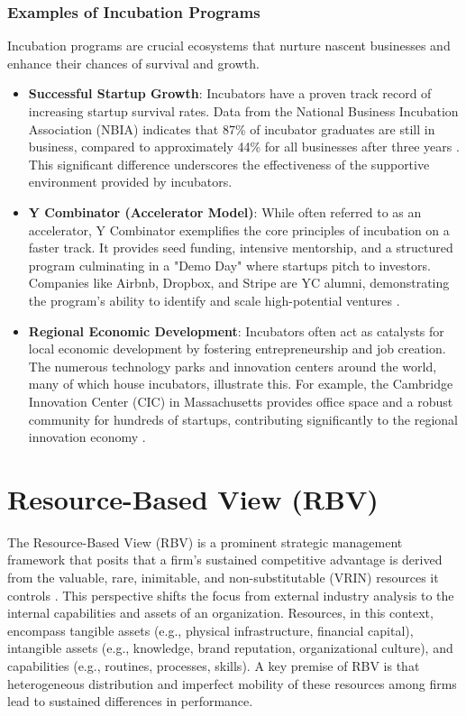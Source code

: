 \documentclass[../Main.tex]{subfiles}
\begin{document}
\subsubsection*{Examples of Incubation Programs}
Incubation programs are crucial ecosystems that nurture nascent businesses and enhance their chances of survival and growth.
\begin{itemize}
\item \textbf{Successful Startup Growth}: Incubators have a proven track record of increasing startup survival rates. Data from the National Business Incubation Association (NBIA) indicates that 87\% of incubator graduates are still in business, compared to approximately 44\% for all businesses after three years \cite{NBIA2012}. This significant difference underscores the effectiveness of the supportive environment provided by incubators.
\item \textbf{Y Combinator (Accelerator Model)}: While often referred to as an accelerator, Y Combinator exemplifies the core principles of incubation on a faster track. It provides seed funding, intensive mentorship, and a structured program culminating in a "Demo Day" where startups pitch to investors. Companies like Airbnb, Dropbox, and Stripe are YC alumni, demonstrating the program's ability to identify and scale high-potential ventures \cite{YCombinator2024}.
\item \textbf{Regional Economic Development}: Incubators often act as catalysts for local economic development by fostering entrepreneurship and job creation. The numerous technology parks and innovation centers around the world, many of which house incubators, illustrate this. For example, the Cambridge Innovation Center (CIC) in Massachusetts provides office space and a robust community for hundreds of startups, contributing significantly to the regional innovation economy \cite{CIC2024}.
\end{itemize}

\section{Resource-Based View (RBV)}

The Resource-Based View (RBV) is a prominent strategic management framework that posits that a firm's sustained competitive advantage is derived from the valuable, rare, inimitable, and non-substitutable (VRIN) resources it controls \cite{barney1991firm}. This perspective shifts the focus from external industry analysis to the internal capabilities and assets of an organization. Resources, in this context, encompass tangible assets (e.g., physical infrastructure, financial capital), intangible assets (e.g., knowledge, brand reputation, organizational culture), and capabilities (e.g., routines, processes, skills). A key premise of RBV is that heterogeneous distribution and imperfect mobility of these resources among firms lead to sustained differences in performance.
\end{document}
